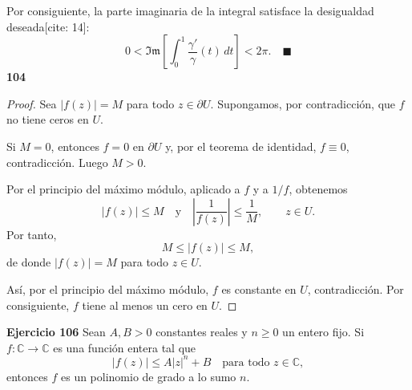 \documentclass[11pt,a4paper]{article}
\theoremstyle{definition}
\theoremstyle{plain}
\theoremstyle{remark}
\begin{document}
	Por consiguiente, la parte imaginaria de la integral satisface la desigualdad deseada[cite: 14]:
	\[
	0 < \mathfrak{Im} \left[ \int_0^1 \frac{\gamma'}{\gamma}(t) \, dt \right] < 2\pi. \quad \blacksquare
	\]
	\textbf{104}
	\begin{proof}
		Sea $|f(z)|=M$ para todo $z\in\partial U$. Supongamos, por
		contradicción, que $f$ no tiene ceros en $U$.
		
		Si $M=0$, entonces $f=0$ en $\partial U$ y, por el teorema
		de identidad, $f\equiv 0$, contradicción. Luego $M>0$.
		
		Por el principio del máximo módulo, aplicado a $f$ y a $1/f$,
		obtenemos
		\[
		|f(z)|\leq M
		\quad\text{y}\quad
		\left|\frac{1}{f(z)}\right|\leq \frac{1}{M},
		\qquad z\in U.
		\]
		Por tanto,
		\[
		M\leq |f(z)|\leq M,
		\]
		de donde $|f(z)|=M$ para todo $z\in U$.
		
		Así, por el principio del máximo módulo, $f$ es constante
		en $U$, contradicción. Por consiguiente, $f$ tiene al menos
		un cero en $U$.
	\end{proof}
	\textbf{Ejercicio 106}
		Sean $A, B > 0$ constantes reales y $n \ge 0$ un entero fijo. Si $f : \mathbb{C} \to \mathbb{C}$ es una función entera tal que
		\[
		|f(z)| \le A |z|^n + B \quad \text{para todo } z \in \mathbb{C},
		\]
		entonces $f$ es un polinomio de grado a lo sumo $n$.
	
\end{document}
